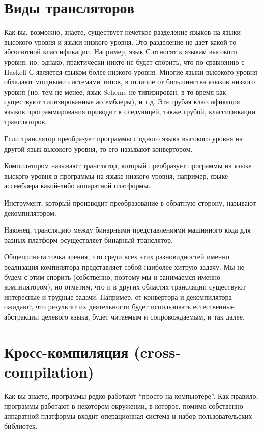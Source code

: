 \documentclass{article}
\begin{document}
\section{Виды трансляторов}

Как вы, возможно, знаете, существует нечеткое разделение языков на языки высокого уровня и языки низкого уровня. Это разделение не дает какой-то абсолютной
классификации. Например, язык С относят к языкам высокого уровня, но, однако, практически никто не будет спорить, что по сравнению с Haskell С является
языком более низкого уровня. Многие языки высокого уровня обладают мощными системами типов, в отличие от большинства языков низкого уровня (но, тем не менее,
язык Scheme не типизирован, в то время как существуют типизированные ассемблеры), и т.д. Эта грубая классификация языков программирования приводит к следующей,
также грубой, классификации трансляторов.

Если транслятор преобразует программы с одного языка высокого уровня на другой язык высокого уровня, то его называют конвертором.

Компилятором называют транслятор, который преобразует программы на языке выского уровня в программы на языке низкого уровня, например, языке ассемблера
какой-либо аппаратной платформы.

Инструмент, который производит преобразование в обратную сторону, называют декомпилятором.

Наконец, трансляцию между бинарными представлениями машинного кода для разных платформ осуществляет бинарный транслятор.

Общепринята точка зрения, что среди всех этих разновидностей именно реализация компилятора представляет собой наиболее хитрую задачу. Мы
не будем с этим спорить (собственно, поэтому мы и занимаемся именно компилятором), но отметим, что и в других областях трансляции
существуют интересные и трудные задачи. Например, от конвертора и декомпилятора ожидают, что результат их деятельности будет использовать
естественные абстракции целевого языка, будет читаемым и сопровождаемым, и так далее.

\section{Кросс-компиляция (cross-compilation)}

Как вы знаете, программы редко работают ``просто на компьютере''. Как правило, программы работают в некотором окружении, в
которое, помимо собственно аппаратной платформы входит операционная система и набор пользовательских библиотек.
\end{document}
